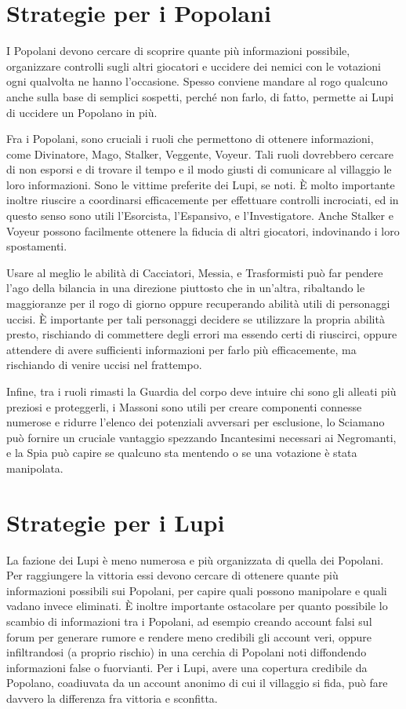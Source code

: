 \documentclass[a4paper,10pt]{article}
\begin{document}
\section{Strategie per i Popolani}

I Popolani devono cercare di scoprire quante più informazioni possibile, organizzare controlli sugli altri giocatori e uccidere dei nemici con le votazioni ogni qualvolta ne hanno l'occasione. Spesso conviene mandare al rogo qualcuno anche sulla base di semplici sospetti, perché non farlo, di fatto, permette ai Lupi di uccidere un Popolano in più.

Fra i Popolani, sono cruciali i ruoli che permettono di ottenere informazioni, come Divinatore, Mago, Stalker, Veggente, Voyeur. Tali ruoli dovrebbero cercare di non esporsi e di trovare il tempo e il modo giusti di comunicare al villaggio le loro informazioni. Sono le vittime preferite dei Lupi, se noti. È molto importante inoltre riuscire a coordinarsi efficacemente per effettuare controlli incrociati, ed in questo senso sono utili l'Esorcista, l'Espansivo, e l'Investigatore. Anche Stalker e Voyeur possono facilmente ottenere la fiducia di altri giocatori, indovinando i loro spostamenti.

Usare al meglio le abilità di Cacciatori, Messia, e Trasformisti può far pendere l'ago della bilancia in una direzione piuttosto che in un'altra, ribaltando le maggioranze per il rogo di giorno oppure recuperando abilità utili di personaggi uccisi. È importante per tali personaggi decidere se utilizzare la propria abilità presto, rischiando di commettere degli errori ma essendo certi di riuscirci, oppure attendere di avere sufficienti informazioni per farlo più efficacemente, ma rischiando di venire uccisi nel frattempo.

Infine, tra i ruoli rimasti la Guardia del corpo deve intuire chi sono gli alleati più preziosi e proteggerli, i Massoni sono utili per creare componenti connesse numerose e ridurre l'elenco dei potenziali avversari per esclusione, lo Sciamano può fornire un cruciale vantaggio spezzando Incantesimi necessari ai Negromanti, e la Spia può capire se qualcuno sta mentendo o se una votazione è stata manipolata.

\section{Strategie per i Lupi}

La fazione dei Lupi è meno numerosa e più organizzata di quella dei Popolani. Per raggiungere la vittoria essi devono cercare di ottenere quante più informazioni possibili sui Popolani, per capire quali possono manipolare e quali vadano invece eliminati. È inoltre importante ostacolare per quanto possibile lo scambio di informazioni tra i Popolani, ad esempio creando account falsi sul forum per generare rumore e rendere meno credibili gli account veri, oppure infiltrandosi (a proprio rischio) in una cerchia di Popolani noti diffondendo informazioni false o fuorvianti. Per i Lupi, avere una copertura credibile da Popolano, coadiuvata da un account anonimo di cui il villaggio si fida, può fare davvero la differenza fra vittoria e sconfitta.
\end{document}
